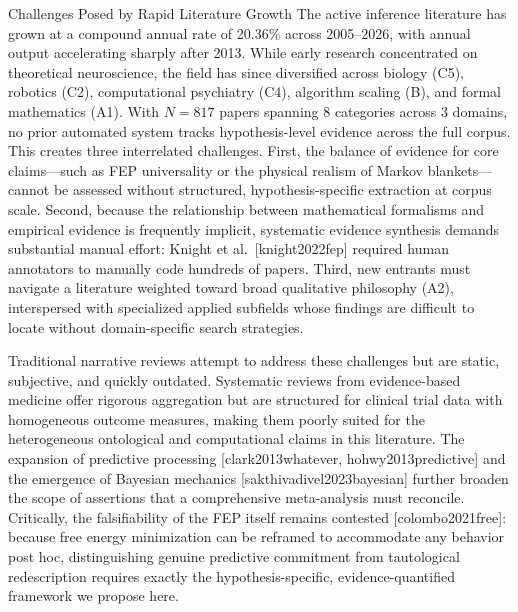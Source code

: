 \documentclass[
  ignorenonframetext,
]{beamer}
\providecommand{\citep}[1]{[#1]}
\begin{document}
\begin{frame}[allowframebreaks]{Challenges Posed by Rapid Literature
Growth}
\protect{}\label{challenges-posed-by-rapid-literature-growth}
The active inference literature has grown at a compound annual rate of
20.36\% across 2005--2026, with annual output accelerating sharply after
2013. While early research concentrated on theoretical neuroscience, the
field has since diversified across biology (C5), robotics (C2),
computational psychiatry (C4), algorithm scaling (B), and formal
mathematics (A1). With \(N = 817\) papers spanning 8 categories across 3
domains, no prior automated system tracks hypothesis-level evidence
across the full corpus. This creates three interrelated challenges.
First, the balance of evidence for core claims---such as FEP
universality or the physical realism of Markov blankets---cannot be
assessed without structured, hypothesis-specific extraction at corpus
scale. Second, because the relationship between mathematical formalisms
and empirical evidence is frequently implicit, systematic evidence
synthesis demands substantial manual effort: Knight et
al.~\citep{knight2022fep} required human annotators to manually code
hundreds of papers. Third, new entrants must navigate a literature
weighted toward broad qualitative philosophy (A2), interspersed with
specialized applied subfields whose findings are difficult to locate
without domain-specific search strategies.

Traditional narrative reviews attempt to address these challenges but
are static, subjective, and quickly outdated. Systematic reviews from
evidence-based medicine offer rigorous aggregation but are structured
for clinical trial data with homogeneous outcome measures, making them
poorly suited for the heterogeneous ontological and computational claims
in this literature. The expansion of predictive processing
\citep{clark2013whatever, hohwy2013predictive} and the emergence of
Bayesian mechanics \citep{sakthivadivel2023bayesian} further broaden the
scope of assertions that a comprehensive meta-analysis must reconcile.
Critically, the falsifiability of the FEP itself remains contested
\citep{colombo2021free}: because free energy minimization can be
reframed to accommodate any behavior post hoc, distinguishing genuine
predictive commitment from tautological redescription requires exactly
the hypothesis-specific, evidence-quantified framework we propose here.
\end{frame}
\end{document}
